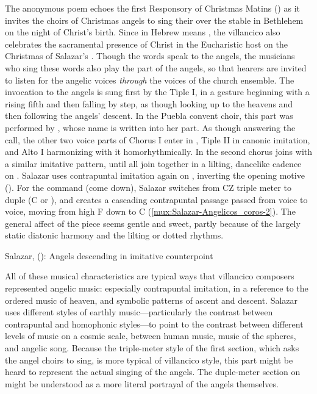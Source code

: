 The anonymous poem echoes the first Responsory of Christmas Matins
() as it invites the choirs of Christmas
angels to sing their  over the stable in Bethlehem on the night
of Christ's birth.
Since  in Hebrew means , the
villancico also celebrates the sacramental presence of Christ in the
Eucharistic host on the Christmas of Salazar's .
Though the words speak to the angels, the musicians who sing these words also
play the part of the angels, so that hearers are invited to listen for the
angelic voices \emph{through} the voices of the church ensemble. 
The invocation to the angels is sung first by the Tiple I, in a gesture
beginning with a rising fifth and then falling by step, as though looking up to
the heavens and then following the angels' descent.
In the Puebla convent choir, this part was performed by ,
whose name is written into her part.
As though answering the call, the other two voice parts of Chorus I enter in
, Tiple II in canonic imitation, and Alto I harmonizing with it
homorhythmically. 
In  the second chorus joins with a similar imitative
pattern, until all join together in a lilting, dancelike cadence on
.
Salazar uses contrapuntal imitation again on ,
inverting the opening motive ().
For the command  (come down), Salazar switches from CZ
triple meter to duple (C or ), and creates a cascading
contrapuntal passage passed from voice to voice, moving from high F
down to C (\cref{mux:Salazar-Angelicos_coros-2}).
The general affect of the piece seems gentle and sweet, partly because of the
largely static diatonic harmony and the lilting or dotted rhythms.

{Salazar,  ():
Angels descending in imitative counterpoint}

All of these musical characteristics are typical ways that villancico composers
represented angelic music: especially contrapuntal imitation, in a reference to
the ordered music of heaven, and symbolic patterns of ascent and descent.
Salazar uses different styles of earthly music---particularly the contrast
between contrapuntal and homophonic styles---to point to the contrast between
different levels of music on a cosmic scale, between human music, music of the
spheres, and angelic song.
Because the triple-meter style of the first section, which asks the angel
choirs to sing, is more typical of villancico style, this part might be heard
to represent the actual singing of the angels.
The duple-meter section on  might be understood as a more literal
portrayal of the angels themselves.

